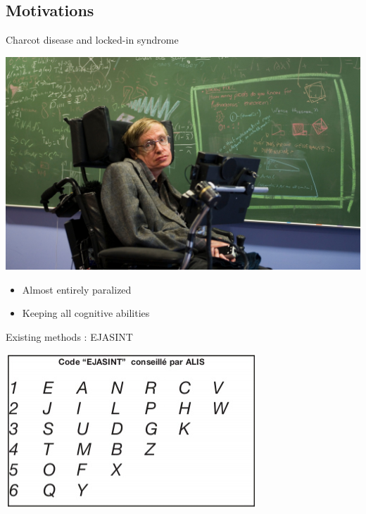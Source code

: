 \documentclass[graphics]{beamer}
\begin{document}
\subsection{Motivations}

\begin{frame}{Charcot disease and locked-in syndrome}
	\begin{center}
		\includegraphics[scale=0.25]{hawking}
	\end{center}
	\begin{center}
		\begin{itemize}
			\item Almost entirely paralized
			\item Keeping all cognitive abilities
		\end{itemize}
	\end{center}
\end{frame}

\begin{frame}{Existing methods : EJASINT}
	\begin{center}
		\includegraphics[scale=0.7]{ejasint}
	\end{center}
\end{frame}
\end{document}
